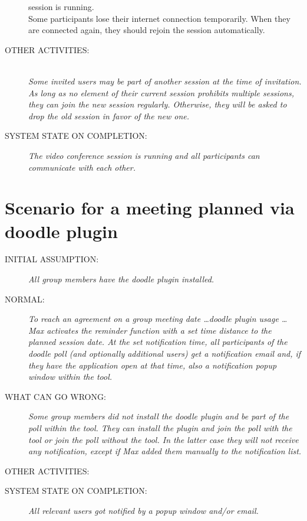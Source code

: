 \begin{description}
{session is running.
\\Some participants lose their internet connection temporarily.
When they are connected again, they should rejoin the session automatically.}
\item[OTHER ACTIVITIES:]
\textit{\\Some invited users may be part of another session at the time of invitation.
As long as no element of their current session prohibits multiple sessions,
they can join the new session regularly. Otherwise, they will be asked to drop
the old session in favor of the new one.}
\item[SYSTEM STATE ON COMPLETION:]
\textit{The video conference session is running and all participants can
communicate with each other.}
\end{description}

\section{Scenario for a meeting planned via doodle plugin}
\begin{description}
\item[INITIAL ASSUMPTION:]
\textit{All group members have the doodle plugin installed.}
\item[NORMAL:]
\textit{To reach an agreement on a group meeting date \ldots doodle plugin usage
\ldots 
\\Max activates the reminder function with a set time distance to the planned
session date. At the set notification time, all participants of the doodle poll
(and optionally additional users) get a notification email and, if they have the
application open at that time, also a notification popup window within the tool.}
\item[WHAT CAN GO WRONG:]
\textit{Some group members did not install the doodle plugin and be part of the
poll within the tool. They can install the plugin and join the poll with the
tool or join the poll without the tool. In the latter case they will not receive
any notification, except if Max added them manually to the notification list.}
\item[OTHER ACTIVITIES:]
\textit{ }
\item[SYSTEM STATE ON COMPLETION:]
\textit{All relevant users got notified by a popup window and/or email.}
\end{description}


